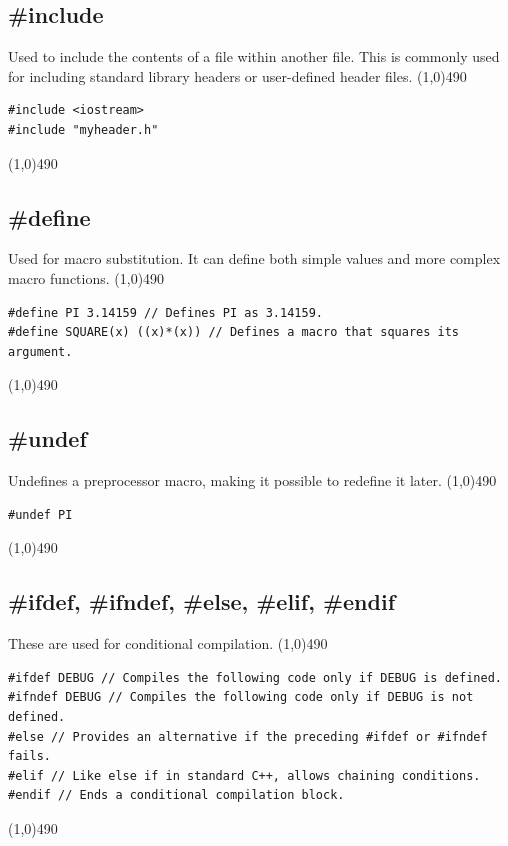 \documentclass{report}
\begin{document}
    \subsection{\#include}
    \bigbreak \noindent 
    Used to include the contents of a file within another file. This is commonly used for including standard library headers or user-defined header files.
    \bigbreak \noindent 
    \line(1,0){490}
    \begin{verbatim}
#include <iostream>
#include "myheader.h"
    \end{verbatim}
    \line(1,0){490}

    \bigbreak \noindent 
    \subsection{\#define}
    \bigbreak \noindent 
    Used for macro substitution. It can define both simple values and more complex macro functions.
    \bigbreak \noindent 
    \line(1,0){490}
    \begin{verbatim}
#define PI 3.14159 // Defines PI as 3.14159.
#define SQUARE(x) ((x)*(x)) // Defines a macro that squares its argument.
    \end{verbatim}
    \line(1,0){490}

    \bigbreak \noindent 
    \subsection{\#undef}
    \bigbreak \noindent 
    Undefines a preprocessor macro, making it possible to redefine it later.
    \bigbreak \noindent 
    \line(1,0){490}
    \begin{verbatim}
#undef PI
    \end{verbatim}
    \line(1,0){490}

    \bigbreak \noindent 
    \subsection{\#ifdef, \#ifndef, \#else, \#elif, \#endif}
    \bigbreak \noindent 
    These are used for conditional compilation.
    \bigbreak \noindent 
    \line(1,0){490}
    \begin{verbatim}
#ifdef DEBUG // Compiles the following code only if DEBUG is defined.
#ifndef DEBUG // Compiles the following code only if DEBUG is not defined.
#else // Provides an alternative if the preceding #ifdef or #ifndef fails.
#elif // Like else if in standard C++, allows chaining conditions.
#endif // Ends a conditional compilation block.
    \end{verbatim}
    \line(1,0){490}
\end{document}
